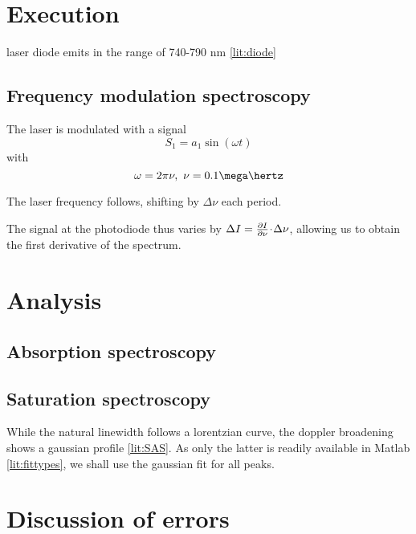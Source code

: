 
\section{Execution} %

laser diode emits in the range of 740-790 nm \ref{lit:diode}

\subsection{Frequency modulation spectroscopy}
The laser is modulated with a signal
\begin{equation}
 S_1 = a_1 \sin(\omega t)
\end{equation}
with
\begin{equation}
 \omega = 2 \pi \nu,~ \nu = 0.1 \mega\hertz
\end{equation}

The laser frequency follows, shifting by $\Delta \nu$ each period.

The signal at the photodiode thus varies by $\Delta I = \frac{\partial I}{\partial\nu} \!\cdot\! \Delta \nu$, allowing us to obtain the first derivative of the spectrum.


\section{Analysis}
\subsection{Absorption spectroscopy}

\subsection{Saturation spectroscopy}





While the natural linewidth follows a lorentzian curve, the doppler broadening shows a gaussian profile \ref{lit:SAS}. As only the latter is readily available in Matlab \ref{lit:fittypes}, we shall use the gaussian fit for all peaks.







\section{Discussion of errors}
